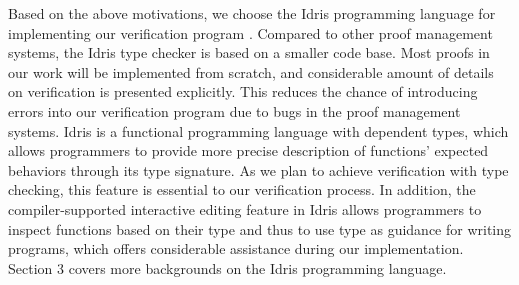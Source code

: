 Based on the above motivations, we choose the Idris programming language for implementing our verification program \cite{idris}. Compared to other proof management systems, the Idris type checker is based on a smaller code base. Most proofs in our work will be implemented from scratch, and considerable amount of details on verification is presented explicitly. This reduces the chance of introducing errors into our verification program due to bugs in the proof management systems. Idris is a functional programming language with dependent types, which allows programmers to provide more precise description of functions' expected behaviors through its type signature. As we plan to achieve verification with type checking, this feature is essential to our verification process. In addition, the compiler-supported interactive editing feature in Idris allows programmers to inspect functions based on their type and thus to use type as guidance for writing programs, which offers considerable assistance during our implementation. Section 3 covers more backgrounds on the Idris programming language. 




